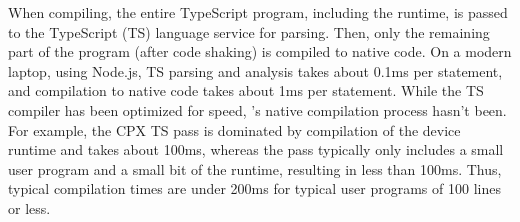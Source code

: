 When compiling, the entire TypeScript program, including the runtime, is
passed to the TypeScript (TS) language service for parsing. Then, only the remaining part of the program (after code shaking) is compiled to native code.
On a modern laptop, using Node.js, TS parsing and analysis takes about 0.1ms per statement, and \MC compilation to native code takes about 1ms per statement.
While the TS compiler has been optimized for speed, \MCN's native compilation process hasn't been. For example, the CPX TS pass is dominated by compilation of the device runtime and takes about 100ms, whereas the \MC pass typically only includes a small user program and a small bit of the runtime, resulting in less than 100ms. Thus, typical compilation times are under 200ms for typical user programs of 100 lines or less.






